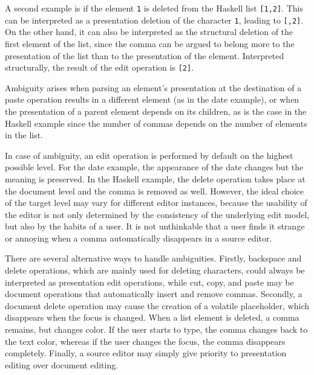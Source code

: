 A second example is if the element \verb|1| is deleted from the Haskell list \verb|[1,2]|. This can be interpreted as a presentation deletion of the character \verb|1|, leading to \verb|[,2]|.  On the other hand, it can also be interpreted as the structural deletion of the first element of the list, since the comma can be argued to belong more to the presentation of the list than to the presentation of the element. Interpreted structurally, the result of the edit operation is \verb|[2]|. 

Ambiguity arises when parsing an element's presentation at the destination of a paste operation results in a different element (as in the date example), or when the presentation of a parent element depends on its children, as is the case in the Haskell example since the number of commas depends on the number of elements in the list. 



In case of ambiguity, an edit operation is performed by default on the highest possible level. For the date example, the appearance of the date changes but the meaning is preserved. In the Haskell example, the delete operation takes place at the document level and the comma is removed as well. However, the ideal choice of the target level may vary for different editor instances, because the usability of the editor is not only determined by the consistency of the underlying edit model, but also by the habits of a user. It is not unthinkable that a user finds it strange or annoying when a comma automatically disappears in a source editor. 

There are several alternative ways to handle ambiguities. Firstly, backspace and delete operations, which are mainly used for deleting characters, could always be interpreted as presentation edit operations, while cut, copy, and paste may be document operations that automatically insert and remove commas. Secondly, a document delete operation may cause the creation of a volatile placeholder, which disappears when the focus is changed. When a list element is deleted, a comma remains, but changes color. If the user starts to type, the comma changes back to the text color, whereas if the user changes the focus, the comma disappears completely. Finally, a source editor may simply give priority to presentation editing over document editing. 

